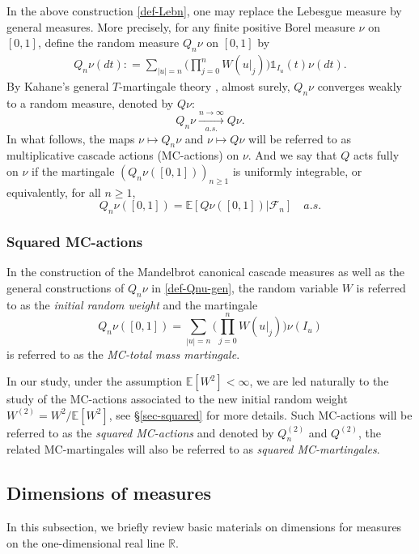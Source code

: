 \documentclass[12pt]{amsart}
\theoremstyle{definition}
\theoremstyle{remark}
\newcommand{\R}{\mathbb{R}}
\newcommand{\E}{\mathbb{E}}
\newcommand{\indi}{\mathds{1}}
\numberwithin{equation}{section}
\begin{document}
In the above construction \eqref{def-Lebn}, one may replace the Lebesgue measure by general measures. More precisely,  for any  finite positive  Borel measure $\nu$ on $[0,1]$, define the random measure  $Q_n\nu$ on $[0,1]$ by 
\begin{align}\label{def-Qnu-gen}
Q_n\nu (dt): = \sum_{|u|=n} \Big(\prod_{j=0}^n W(u|_j) \Big) \indi_{I_u} (t)\nu(dt). 
\end{align}
By Kahane's general $T$-martingale  theory  \cite{Kahane-1987}, almost surely, $Q_n\nu$ converges weakly to a random measure, denoted by $Q\nu$: 
\[
Q_n\nu \xrightarrow[a.s.]{n\to\infty} Q\nu.
\]
In what follows,  the maps  $\nu\mapsto Q_n \nu$ and $\nu\mapsto Q\nu$  will be referred to as  multiplicative cascade actions (MC-actions) on $\nu$.    And we say that $Q$ acts fully on $\nu$ if the martingale $(Q_n\nu([0,1]))_{n\ge 1}$ is uniformly integrable, or equivalently, for all $n\ge 1$, 
\[
Q_n\nu([0,1]) = \E[Q\nu([0,1])|\mathscr{F}_n] \quad a.s. 
\]


\subsubsection{Squared MC-actions}\label{sec-sq-mc}
In the construction of the Mandelbrot canonical cascade measures as well as the general constructions of $Q_n\nu$ in \eqref{def-Qnu-gen},  the random variable  $W$ is referred to as the {\it initial random weight} and    the martingale 
\[
Q_n\nu([0,1])  = \sum_{|u|= n}  \Big(\prod_{j=0}^n W(u|_j) \Big) \nu(I_u)
\]
is referred to as the {\it MC-total mass martingale}. 

In our study,  under the assumption $\E[W^2]<\infty$,   we are led naturally to the study of the  MC-actions associated  to the new initial random weight $W^{(2)} = W^2/\E[W^2]$, see \S \ref{sec-squared} for more details. Such MC-actions will be referred to as  the {\it squared MC-actions} and denoted by $Q_n^{(2)}$ and $Q^{(2)}$, the  related MC-martingales will also be referred to as {\it squared MC-martingales}. 





\subsection{Dimensions of measures}

In this subsection, we briefly review  basic materials on dimensions for measures on the one-dimensional real line $\R$.
\end{document}
